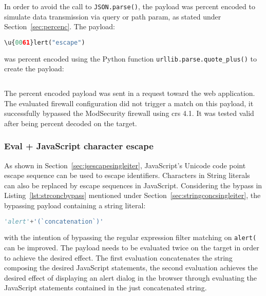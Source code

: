 In order to avoid the call to \verb|JSON.parse()|, the payload was percent encoded to simulate data transmission via query or path param, as stated under Section~\ref{sec:percenc}. The payload:

\begin{lstlisting}[style=basicStyle, escapeinside=\^\^, language=Python]
\u{0061}lert("escape")
\end{lstlisting}

was percent encoded using the Python function \verb|urllib.parse.quote_plus()| to create the payload:

\begin{lstlisting}[style=basicStyle, escapeinside=\^\^, language=Python, caption={\textbackslash u\{0061\}lert("escape") percent encoded bypass}]
%5Cu%7B0061%7Dlert%28%27escape%27%29
\end{lstlisting}

The percent encoded payload was sent in a request toward the web application. The evaluated firewall configuration did not trigger a match on this payload, it successfully bypassed the ModSecurity firewall using \acrshort{crs} 4.1. It was tested valid after being percent decoded on the target.

\subsubsection{Eval + JavaScript character escape}
\label{sec:jsescapemultiiter}
As shown in Section~\ref{sec:jsescapesingleiter}, JavaScript's Unicode code point escape sequence can be used to escape identifiers.
Characters in String literals can also be replaced by escape sequences in JavaScript. Considering the bypass in Listing~\ref{lst:strconcbypass} mentioned under Section~\ref{sec:stringconcsingleiter}, the bypassing payload containing a string literal:

\begin{lstlisting}[style=basicStyle, language=Python]
'alert'+'(`concatenation`)'
\end{lstlisting}

with the intention of bypassing the regular expression filter matching on \verb|alert(| can be improved. The payload needs to be evaluated twice on the target in order to achieve the desired effect. The first evaluation concatenates the string composing the desired JavaScript statements, the second evaluation achieves the desired effect of displaying an alert dialog in the browser through evaluating the JavaScript statements contained in the just concatenated string.

